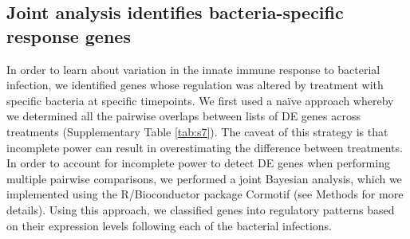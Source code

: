 \subsection{Joint analysis identifies bacteria-specific response
genes}\label{joint-analysis-identifies-bacteria-specific-response-genes}

In order to learn about variation in the innate immune response to
bacterial infection, we identified genes whose regulation was altered by
treatment with specific bacteria at specific timepoints. We first used a
naïve approach whereby we determined all the pairwise overlaps between
lists of DE genes across treatments (Supplementary Table \ref{tab:s7}). The caveat
of this strategy is that incomplete power can result in overestimating
the difference between treatments. In order to account for incomplete
power to detect DE genes when performing multiple pairwise comparisons,
we performed a joint Bayesian analysis, which we implemented using the
R/Bioconductor package Cormotif \citep{Wei2015} (see Methods for more
details). Using this approach, we classified genes into regulatory
patterns based on their expression levels following each of the
bacterial infections.

